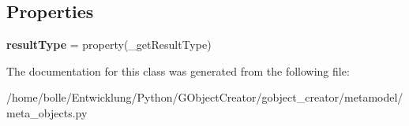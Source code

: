 \subsection*{Properties}
\begin{DoxyCompactItemize}
\item 
\hypertarget{classgobject__creator_1_1metamodel_1_1meta__objects_1_1Method_a9f571148a49c8c35d37e7abcd72dfecc}{
{\bfseries resultType} = property(\_\-getResultType)}
\label{classgobject__creator_1_1metamodel_1_1meta__objects_1_1Method_a9f571148a49c8c35d37e7abcd72dfecc}

\end{DoxyCompactItemize}


The documentation for this class was generated from the following file:\begin{DoxyCompactItemize}
\item 
/home/bolle/Entwicklung/Python/GObjectCreator/gobject\_\-creator/metamodel/meta\_\-objects.py\end{DoxyCompactItemize}

